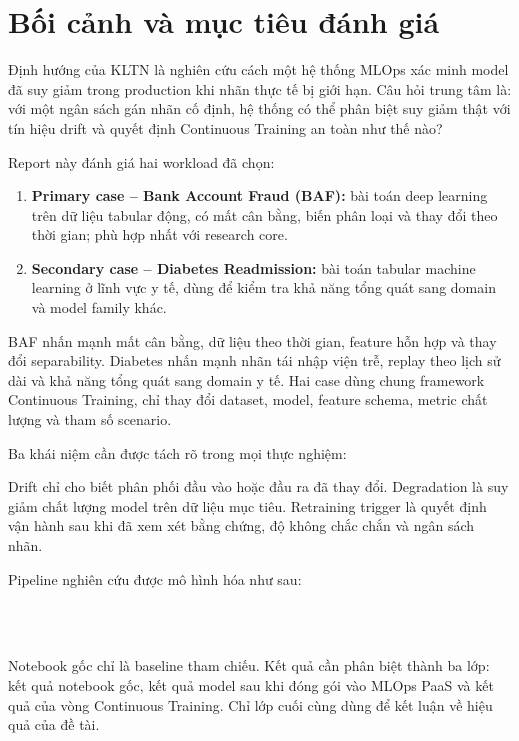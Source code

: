 \section{Bối cảnh và mục tiêu đánh giá}

Định hướng của KLTN là nghiên cứu cách một hệ thống MLOps xác minh model đã suy giảm trong production khi nhãn thực tế bị giới hạn. Câu hỏi trung tâm là: với một ngân sách gán nhãn cố định, hệ thống có thể phân biệt suy giảm thật với tín hiệu drift và quyết định Continuous Training an toàn như thế nào?

Report này đánh giá hai workload đã chọn:

\begin{enumerate}
  \item \textbf{Primary case -- Bank Account Fraud (BAF):} bài toán deep learning trên dữ liệu tabular động, có mất cân bằng, biến phân loại và thay đổi theo thời gian; phù hợp nhất với research core.
  \item \textbf{Secondary case -- Diabetes Readmission:} bài toán tabular machine learning ở lĩnh vực y tế, dùng để kiểm tra khả năng tổng quát sang domain và model family khác.
\end{enumerate}

BAF nhấn mạnh mất cân bằng, dữ liệu theo thời gian, feature hỗn hợp và thay đổi separability. Diabetes nhấn mạnh nhãn tái nhập viện trễ, replay theo lịch sử dài và khả năng tổng quát sang domain y tế. Hai case dùng chung framework Continuous Training, chỉ thay đổi dataset, model, feature schema, metric chất lượng và tham số scenario.

Ba khái niệm cần được tách rõ trong mọi thực nghiệm:

\begin{center}
\end{center}

Drift chỉ cho biết phân phối đầu vào hoặc đầu ra đã thay đổi. Degradation là suy giảm chất lượng model trên dữ liệu mục tiêu. Retraining trigger là quyết định vận hành sau khi đã xem xét bằng chứng, độ không chắc chắn và ngân sách nhãn.

Pipeline nghiên cứu được mô hình hóa như sau:

\begin{center}
\\
\\
\end{center}

Notebook gốc chỉ là baseline tham chiếu. Kết quả cần phân biệt thành ba lớp: kết quả notebook gốc, kết quả model sau khi đóng gói vào MLOps PaaS và kết quả của vòng Continuous Training. Chỉ lớp cuối cùng dùng để kết luận về hiệu quả của đề tài.
